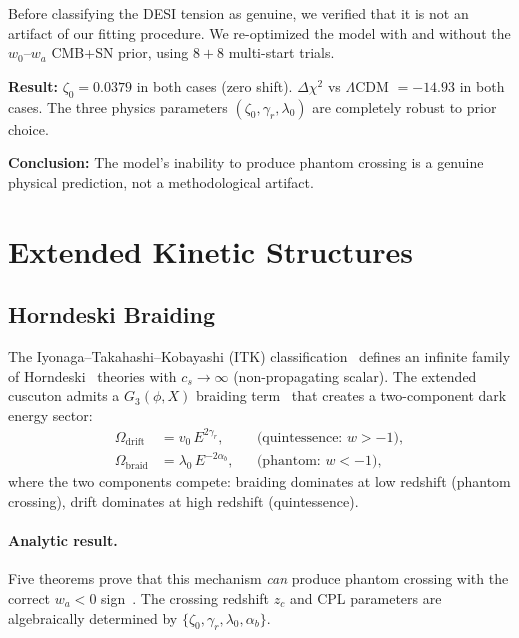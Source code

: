 Before classifying the DESI tension as genuine, we verified that it is not an artifact of our fitting procedure. We re-optimized the model with and without the $w_0$--$w_a$ CMB+SN prior, using $8+8$ multi-start trials.

\textbf{Result:} $\zeta_0 = 0.0379$ in both cases (zero shift). $\Delta\chi^2$ vs $\Lambda$CDM $= -14.93$ in both cases. The three physics parameters $(\zeta_0, \gamma_r, \lambda_0)$ are completely robust to prior choice.

\textbf{Conclusion:} The model's inability to produce phantom crossing is a genuine physical prediction, not a methodological artifact.

\section{Extended Kinetic Structures}
\label{sec:3-kinetic}

\subsection{Horndeski Braiding}
\label{sec:3-braiding}

The Iyonaga--Takahashi--Kobayashi (ITK) classification~\cite{ch3:itk2018} defines an infinite family of Horndeski~\cite{ch3:horndeski1974} theories with $c_s \to \infty$ (non-propagating scalar). The extended cuscuton admits a $G_3(\phi, X)$ braiding term~\cite{ch3:deffayet2010} that creates a two-component dark energy sector:
\begin{align}
  \Omega_{\mathrm{drift}}  &= v_0\, E^{2\gamma_r},        & &\text{(quintessence: } w > -1\text{)}, \label{eq:3-14} \\
  \Omega_{\mathrm{braid}} &= \lambda_0\, E^{-2\alpha_b},  & &\text{(phantom: } w < -1\text{)},      \label{eq:3-15}
\end{align}
where the two components compete: braiding dominates at low redshift (phantom crossing), drift dominates at high redshift (quintessence).

\paragraph{Analytic result.} Five theorems prove that this mechanism \emph{can} produce phantom crossing with the correct $w_a < 0$ sign~\cite{ch3:paper1}. The crossing redshift $z_c$ and CPL parameters are algebraically determined by $\{\zeta_0, \gamma_r, \lambda_0, \alpha_b\}$.

